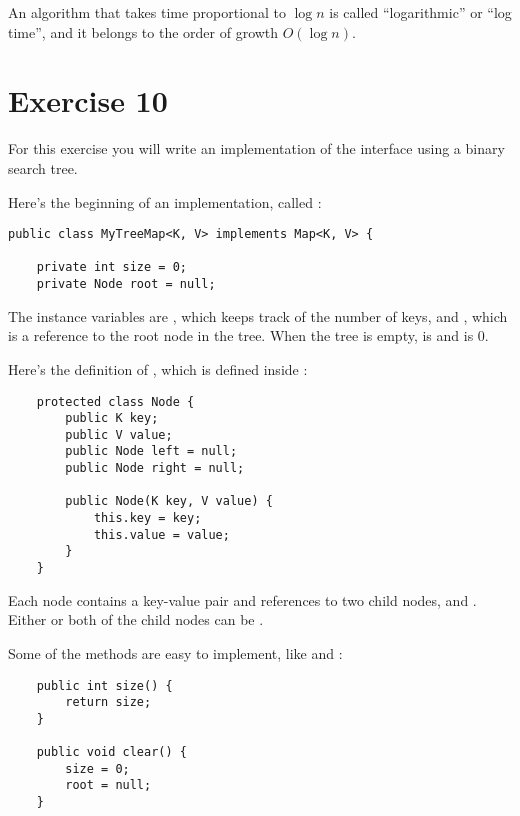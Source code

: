 \documentclass[12pt]{book}
\theoremstyle{exercise}
\begin{document}

An algorithm that takes time proportional to $\log n$ is called
``logarithmic'' or ``log time'', and it belongs to the order of growth
$O(\log n)$.


\section{Exercise 10}
\label{exercise10}

For this exercise you will write an implementation of
the  interface using a binary search tree.


Here's the beginning of an implementation, called :

\begin{verbatim}
public class MyTreeMap<K, V> implements Map<K, V> {

    private int size = 0;
    private Node root = null;
\end{verbatim}

The instance variables are , which keeps track of the
number of keys, and , which is a reference to the root node
in the tree. When the tree is empty,  is  and
 is 0.

Here's the definition of , which is defined inside
:

\begin{verbatim}
    protected class Node {
        public K key;
        public V value;
        public Node left = null;
        public Node right = null;

        public Node(K key, V value) {
            this.key = key;
            this.value = value;
        }
    }
\end{verbatim}


Each node contains a key-value pair and references to two child nodes,
 and . Either or both of the child nodes can
be .

Some of the  methods are easy to implement, like
 and :

\begin{verbatim}
    public int size() {
        return size;
    }

    public void clear() {
        size = 0;
        root = null;
    }
\end{verbatim}
\end{document}
